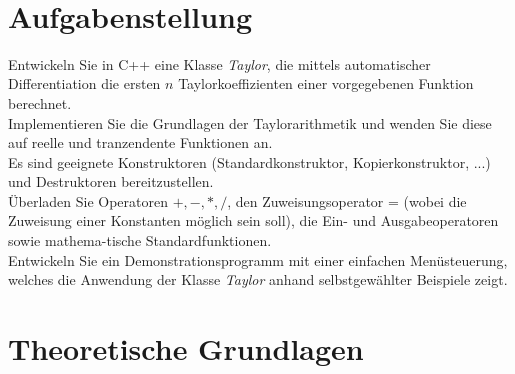 \documentclass{scrartcl}
\begin{document}

\thispagestyle{empty}
\tableofcontents
\\
\newpage
\setcounter{page}{1}
\section{Aufgabenstellung}
Entwickeln Sie in C++ eine Klasse \textit{Taylor}, die mittels automatischer Differentiation die ersten $n$ Taylorkoeffizienten einer vorgegebenen Funktion berechnet.\\
Implementieren Sie die Grundlagen der Taylorarithmetik und wenden Sie diese auf reelle und tranzendente Funktionen an.\\
Es sind geeignete Konstruktoren (Standardkonstruktor, Kopierkonstruktor, ...) und Destruktoren bereitzustellen.\\
Überladen Sie Operatoren $+,-,*,/$, den Zuweisungsoperator = (wobei die Zuweisung einer Konstanten möglich sein soll), die Ein- und Ausgabeoperatoren sowie mathema-tische Standardfunktionen.\\
Entwickeln Sie ein Demonstrationsprogramm mit einer einfachen Menüsteuerung, welches die Anwendung der Klasse \textit{Taylor} anhand selbstgewählter Beispiele zeigt.

\section{Theoretische Grundlagen}
\end{document}
